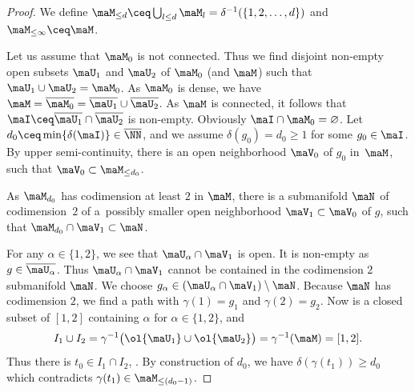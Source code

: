 \begin{proof}
We define $\maM_{\leq d}\ceq \bigcup_{l\leq d}\maM_l=\delta^{-1}(\{1,2,\ldots,d\})$ and $\maM_{\leq \infty}\ceq \maM$.

Let us assume that $\maM_0$ is not connected.
Thus we find disjoint non-empty open subsets $\maU_1$ and $\maU_2$ of $\maM_0$ (and $\maM$) such that $\maU_1\cup \maU_2=\maM_0$.
As $\maM_0$ is dense, we have $\maM=\overline{\maM_0}=\overline{\maU_1}\cup \overline{\maU_2}$.
As $\maM$ is connected, it follows that $\maI\ceq \overline{\maU_1}\cap \overline{\maU_2}$ is non-empty.
Obviously $\maI\cap \maM_0=\varnothing$. Let $d_0\ceq\min\{\delta(\maI)\}\in \overline{\NN}$, and we assume $\delta(g_0)=d_0\geq 1$ for some $g_0\in \maI$.
By upper semi-continuity, there is an open neighborhood $\maV_0$ of $g_0$ in~$\maM$, such that $\maV_0\subset \maM_{\leq d_0}$.

As $\maM_{d_0}$ has codimension at least $2$ in $\maM$, there is a submanifold $\maN$ of codimension~$2$ of a~possibly smaller open neighborhood $\maV_1\subset \maV_0$ of $g$, such that $\maM_{d_0}\cap \maV_1\subset \maN$.

For any $\alpha\in \{1,2\}$, we see that $\maU_\alpha\cap \maV_1$ is open. It is non-empty as $g\in \overline{\maU_\alpha}$.
Thus $\maU_\alpha\cap \maV_1$ cannot be contained in the codimension $2$ submanifold $\maN$.
We choose $g_\alpha\in (\maU_\alpha\cap \maV_1)\setminus \maN$. Because $\maN$ has codimension $2$, we find a path  with $\gamma(1)=g_1$ and $\gamma(2)=g_2$. Now  is a closed subset of $[1,2]$ containing $\alpha$ for $\alpha\in\{1,2\}$, and
\[
I_1\cup I_2= \gamma^{-1}\bigl(\ol{\maU_1}\cup \ol{\maU_2}\bigr)= \gamma^{-1}(\maM)=[1,2].
\]
Thus there is $t_0\in I_1\cap I_2$, \ie {}. By construction of $d_0$, we have $\delta(\gamma(t_1))\geq d_0$ which contradicts $\gamma(t_1)\in\maM_{\leq (d_0-1)}$.
\end{proof}

